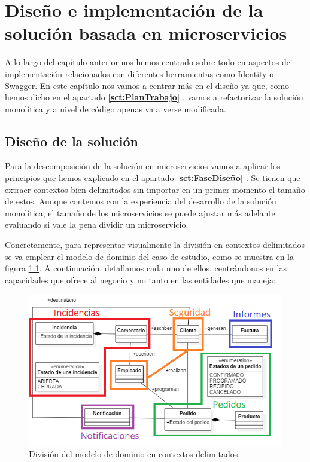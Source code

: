 \documentclass[11pt,spanish,listoffigures]{tfgetsinf}
\begin{document}
%

\chapter{Diseño e implementación de la solución basada en microservicios}

A lo largo del capítulo anterior nos hemos centrado sobre todo en aspectos de implementación relacionados con diferentes herramientas como Identity o Swagger. En este capítulo nos vamos a centrar más en el diseño ya que, como hemos dicho en el apartado \textbf{\ref{sct:PlanTrabajo} }, vamos a refactorizar la solución monolítica y a nivel de código apenas va a verse modificada.

\section{Diseño de la solución}

Para la descomposición de la solución en microservicios vamos a aplicar los principios que hemos explicado en el apartado \textbf{\ref{sct:FaseDiseño} }. Se tienen que extraer contextos bien delimitados sin importar en un primer momento el tamaño de estos. Aunque contemos con la experiencia del desarrollo de la solución monolítica, el tamaño de los microservicios se puede ajustar más adelante evaluando si vale la pena dividir un microservicio.

Concretamente, para representar visualmente la división en contextos delimitados se va emplear el modelo de dominio del caso de estudio, como se muestra en la figura \ref{fig:ShopBoundedContexts}. A continuación, detallamos cada uno de ellos, centrándonos en las capacidades que ofrece al negocio y no tanto en las entidades que maneja:

\begin{figure}[h]
\centering
\includegraphics[scale=1]{ShopBoundedContexts}
\caption{División del modelo de dominio en contextos delimitados.}
\label{fig:ShopBoundedContexts}
\end{figure}
\end{document}

